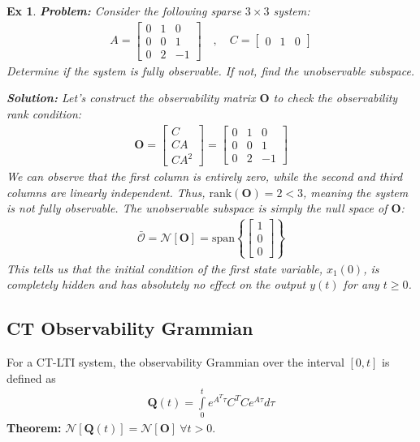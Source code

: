 \documentclass[twoside]{article}
\newtheorem{exmp}[theorem]{Ex}
\begin{document}
\begin{exmp}
\textbf{Problem:} Consider the following sparse $3 \times 3$ system:
\begin{align*}
    A = \begin{bmatrix} 0 & 1 & 0 \\ 0 & 0 & 1 \\ 0 & 2 & -1 \end{bmatrix} \quad , \quad C = \begin{bmatrix} 0 & 1 & 0 \end{bmatrix}
\end{align*}
Determine if the system is fully observable. If not, find the unobservable subspace.

\textbf{Solution:}
Let's construct the observability matrix $\mathbf{O}$ to check the observability rank condition:
\begin{align*}
    \mathbf{O} = \begin{bmatrix} C \\ C A \\ C A^2 \end{bmatrix} = \begin{bmatrix} 0 & 1 & 0 \\ 0 & 0 & 1 \\ 0 & 2 & -1 \end{bmatrix}
\end{align*}
We can observe that the first column is entirely zero, while the second and third columns are linearly independent. Thus, $\mathrm{rank}(\mathbf{O}) = 2 < 3$, meaning the system is not fully observable. The unobservable subspace is simply the null space of $\mathbf{O}$:
\begin{align*}
    \bar{\mathcal{O}} = \mathcal{N}[\mathbf{O}] = \mathrm{span} \left\{ \begin{bmatrix} 1 \\ 0 \\ 0 \end{bmatrix} \right\}
\end{align*}
This tells us that the initial condition of the first state variable, $x_1(0)$, is completely hidden and has absolutely no effect on the output $y(t)$ for any $t \ge 0$.
\end{exmp}

\subsection{CT Observability Grammian}

For a CT-LTI system, the observability Grammian over the interval $[0, t]$ is defined as
%
\begin{align*}
    \mathbf{Q}(t) = \int\limits_{0}^{t} e^{A^T \tau} C^T C e^{A \tau} d\tau 
\end{align*}
%
\textbf{Theorem:} $\mathcal{N}[ \mathbf{Q}(t) ] = \mathcal{N}[ \mathbf{O} ] \ \forall t > 0$. 
\end{document}

